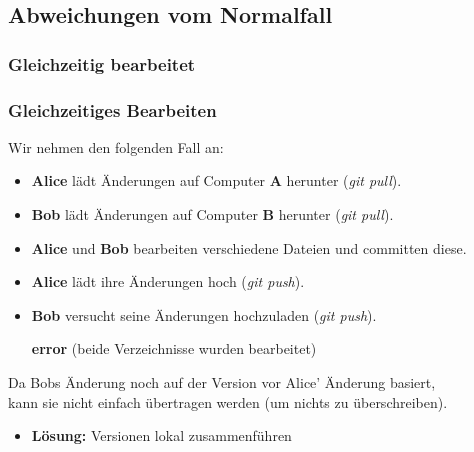 \documentclass[accentcolor=tud8b,colorbacktitle,inverttitle,landscape,german,presentation,t]{tudbeamer}
\begin{document}
	\subsection{Abweichungen vom Normalfall}
		\subsubsection{Gleichzeitig bearbeitet}
			\begin{frame}
			\frametitle{Gleichzeitiges Bearbeiten}
				Wir nehmen den folgenden Fall an:
				\begin{itemize}
					\item \textbf{Alice} lädt Änderungen auf Computer \textbf{A} herunter (\textit{git pull}).
					\item \textbf{Bob} lädt Änderungen auf Computer \textbf{B} herunter (\textit{git pull}).
					\item \textbf{Alice} und \textbf{Bob} bearbeiten verschiedene Dateien und committen diese.
					\item \textbf{Alice} lädt ihre Änderungen hoch (\textit{git push}).
					\item \textbf{Bob } versucht seine Änderungen hochzuladen (\textit{git push}).
					\item [\textbf{error}] (beide Verzeichnisse wurden bearbeitet)
				\end{itemize}
				
				Da Bobs Änderung noch auf der Version vor Alice' Änderung basiert,\\
				kann sie nicht einfach übertragen werden (um nichts zu überschreiben).\\
				\begin{itemize}
					\item \textbf{Lösung:} Versionen lokal zusammenführen
				\end{itemize}
			\end{frame}
			
\end{document}
